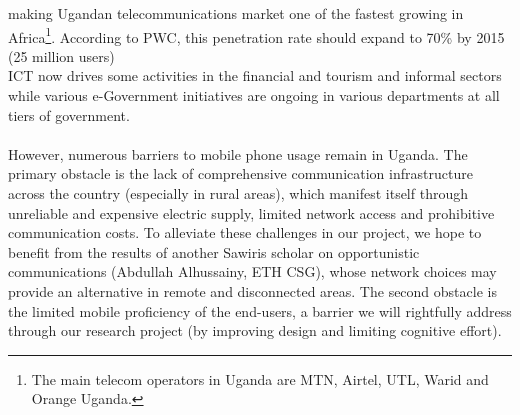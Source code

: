 \documentclass[11pt]{article}
\begin{document}
making Ugandan telecommunications market one of the fastest growing in Africa\footnote{The main telecom operators in Uganda are MTN, Airtel, UTL, Warid and Orange Uganda.}. According to PWC, this penetration rate should expand to 70\% by 2015 (25 million users) 
\\
ICT now drives some activities in the financial and tourism and informal sectors while various e-Government initiatives are ongoing in various departments at all tiers of government\cite{Nora10}\cite{Post11}. 
\\\\
However, numerous barriers to mobile phone usage remain in Uganda. The primary obstacle is the lack of comprehensive communication infrastructure across the country (especially in rural areas), which manifest itself through unreliable and expensive electric supply, limited network access and prohibitive communication costs. To alleviate these challenges in our project, we hope to benefit from the results of another Sawiris scholar on opportunistic communications (Abdullah Alhussainy, ETH CSG), whose network choices may provide an alternative in remote and disconnected areas. The second obstacle is the limited mobile proficiency of the end-users, a barrier we will rightfully address through our research project (by improving design and limiting cognitive effort). 
\end{document}
